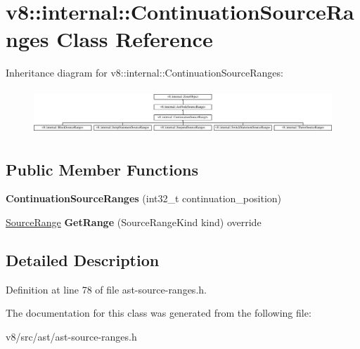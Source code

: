 \hypertarget{classv8_1_1internal_1_1ContinuationSourceRanges}{}\section{v8\+:\+:internal\+:\+:Continuation\+Source\+Ranges Class Reference}
\label{classv8_1_1internal_1_1ContinuationSourceRanges}
Inheritance diagram for v8\+:\+:internal\+:\+:Continuation\+Source\+Ranges\+:\begin{figure}[H]
\begin{center}
\leavevmode
\includegraphics[height=1.709924cm]{classv8_1_1internal_1_1ContinuationSourceRanges}
\end{center}
\end{figure}
\subsection*{Public Member Functions}
\begin{DoxyCompactItemize}
\item 
\mbox{\label{classv8_1_1internal_1_1ContinuationSourceRanges_a0faf19d4c35062c42ce5000dcb7fd710}} 
{\bfseries Continuation\+Source\+Ranges} (int32\+\_\+t continuation\+\_\+position)
\item 
\mbox{\label{classv8_1_1internal_1_1ContinuationSourceRanges_a5bef2a2636b6a361448d5ad1aef2f3d7}} 
\mbox{\hyperlink{structv8_1_1internal_1_1SourceRange}{Source\+Range}} {\bfseries Get\+Range} (Source\+Range\+Kind kind) override
\end{DoxyCompactItemize}


\subsection{Detailed Description}


Definition at line 78 of file ast-\/source-\/ranges.\+h.



The documentation for this class was generated from the following file\+:\begin{DoxyCompactItemize}
\item 
v8/src/ast/ast-\/source-\/ranges.\+h\end{DoxyCompactItemize}
